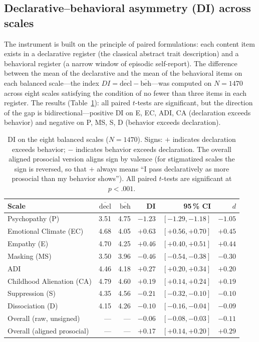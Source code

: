 \subsection{Declarative--behavioral asymmetry (DI) across scales}
\label{subsec:di_results}

The instrument is built on the principle of paired formulations: each content item exists in a declarative register (the classical abstract trait description) and a behavioral register (a narrow window of episodic self-report). The difference between the mean of the declarative and the mean of the behavioral items on each balanced scale---the index $DI = \overline{\text{decl}} - \overline{\text{beh}}$---was computed on $N{=}1470$ across eight scales satisfying the condition of no fewer than three items in each register. The results (Table~\ref{tab:di_per_scale}): all paired $t$-tests are significant, but the direction of the gap is bidirectional---positive DI on E, EC, ADI, CA (declaration exceeds behavior) and negative on P, MS, S, D (behavior exceeds declaration).

\begin{table}[H]
\centering
\begin{tabular}{l r r r r r}
\toprule
Scale & $\overline{\text{decl}}$ & $\overline{\text{beh}}$ & DI & 95\,\% CI & $d$ \\
\midrule
Psychopathy (P) & 3.51 & 4.75 & $-1.23$ & $[-1.29, -1.18]$ & $-1.05$ \\
Emotional Climate (EC) & 4.68 & 4.05 & $+0.63$ & $[+0.56, +0.70]$ & $+0.45$ \\
Empathy (E) & 4.70 & 4.25 & $+0.46$ & $[+0.40, +0.51]$ & $+0.44$ \\
Masking (MS) & 3.50 & 3.96 & $-0.46$ & $[-0.54, -0.38]$ & $-0.30$ \\
ADI & 4.46 & 4.18 & $+0.27$ & $[+0.20, +0.34]$ & $+0.20$ \\
Childhood Alienation (CA) & 4.79 & 4.60 & $+0.19$ & $[+0.14, +0.24]$ & $+0.19$ \\
Suppression (S) & 4.35 & 4.56 & $-0.21$ & $[-0.32, -0.10]$ & $-0.10$ \\
Dissociation (D) & 4.15 & 4.26 & $-0.10$ & $[-0.16, -0.04]$ & $-0.09$ \\
\midrule
Overall (raw, unsigned) & --- & --- & $-0.06$ & $[-0.08, -0.03]$ & $-0.11$ \\
Overall (aligned prosocial) & --- & --- & $+0.17$ & $[+0.14, +0.20]$ & $+0.29$ \\
\bottomrule
\end{tabular}
\caption{DI on the eight balanced scales ($N{=}1470$). Signs: $+$ indicates declaration exceeds behavior; $-$ indicates behavior exceeds declaration. The overall aligned prosocial version aligns sign by valence (for stigmatized scales the sign is reversed, so that $+$ always means ``I pass declaratively as more prosocial than my behavior shows''). All paired $t$-tests are significant at $p < .001$.}
\label{tab:di_per_scale}
\end{table}

